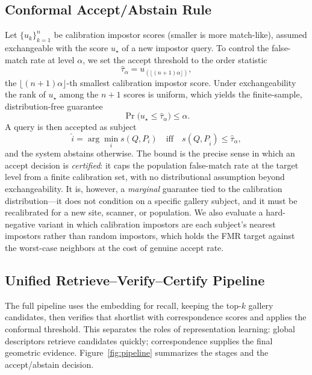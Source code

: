 \documentclass[10pt,twocolumn]{article}
\newcommand{\score}{s}
\begin{document}
\subsection{Conformal Accept/Abstain Rule}
Let $\{u_k\}_{k=1}^n$ be calibration impostor scores (smaller is more match-like), assumed exchangeable with the score $u_\star$ of a new impostor query. To control the false-match rate at level $\alpha$, we set the accept threshold to the order statistic
\begin{equation}
  \hat{\tau}_\alpha = u_{(\lfloor (n+1)\alpha \rfloor)},
\end{equation}
the $\lfloor (n+1)\alpha\rfloor$-th smallest calibration impostor score. Under exchangeability the rank of $u_\star$ among the $n+1$ scores is uniform, which yields the finite-sample, distribution-free guarantee
\begin{equation}
  \Pr\!\big(u_\star \le \hat{\tau}_\alpha\big) \le \alpha .
\end{equation}
A query is then accepted as subject
\begin{equation}
  \hat{i}=\arg\min_i \score(Q,P_i)
  \quad\text{iff}\quad
  \score(Q,P_{\hat{i}})\le \hat{\tau}_\alpha ,
\end{equation}
and the system abstains otherwise. The bound is the precise sense in which an accept decision is \emph{certified}: it caps the population false-match rate at the target level from a finite calibration set, with no distributional assumption beyond exchangeability. It is, however, a \emph{marginal} guarantee tied to the calibration distribution---it does not condition on a specific gallery subject, and it must be recalibrated for a new site, scanner, or population. We also evaluate a hard-negative variant in which calibration impostors are each subject's nearest impostors rather than random impostors, which holds the FMR target against the worst-case neighbors at the cost of genuine accept rate.

\subsection{Unified Retrieve--Verify--Certify Pipeline}
The full pipeline uses the embedding for recall, keeping the top-$k$ gallery candidates, then verifies that shortlist with correspondence scores and applies the conformal threshold. This separates the roles of representation learning: global descriptors retrieve candidates quickly; correspondence supplies the final geometric evidence. Figure~\ref{fig:pipeline} summarizes the stages and the accept/abstain decision.
\end{document}
